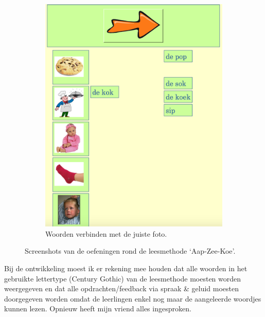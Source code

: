 \documentclass[a4paper,11pt]{article}
\theoremstyle{definition}
\begin{document}
\begin{itemize}
\begin{itemize}
\begin{figure}[h!]
\begin{subfigure}{.5\textwidth}
                \includegraphics[scale=0.15]{aap2.jpg}
                \caption{Woorden verbinden met de juiste foto.}
                \label{aap2}
        \end{subfigure}
           \caption{Screenshots van de oefeningen rond de leesmethode `Aap-Zee-Koe'.}
\end{figure}
 \noindent Bij de ontwikkeling moest ik er rekening mee houden dat alle woorden in het gebruikte lettertype (Century Gothic) van de 
 leesmethode moesten worden weergegeven en dat alle opdrachten/feedback via spraak 
 \& geluid moesten doorgegeven worden omdat de leerlingen enkel nog maar de 
 aangeleerde woordjes kunnen lezen. Opnieuw heeft mijn vriend alles ingesproken. 
 \\
 

\end{itemize}
\end{itemize}
\end{document}
